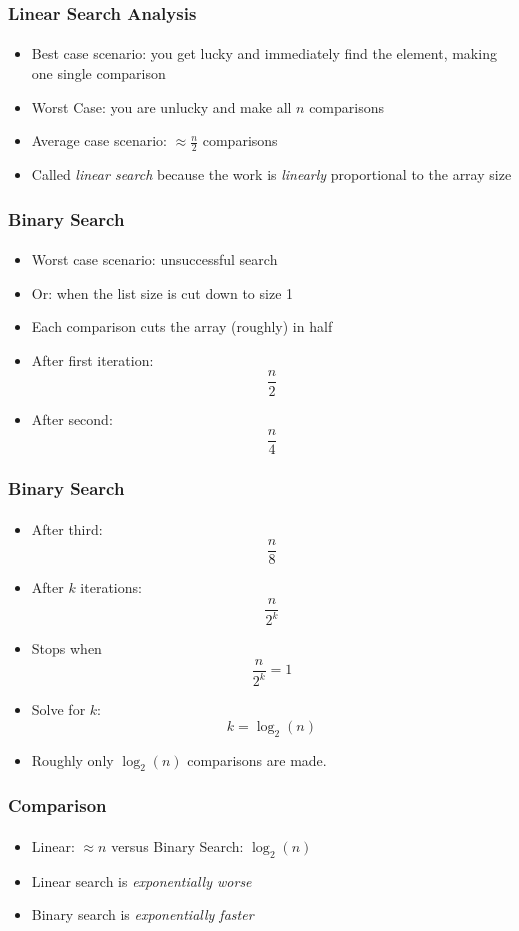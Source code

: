 \documentclass[]{beamer}
\begin{document}
\begin{frame}[fragile]
  \frametitle{Linear Search Analysis}
  \framesubtitle{}
  
\begin{itemize}[<+->]
  \item Best case scenario: you get lucky and immediately find the element, making one single comparison
  \item Worst Case: you are unlucky and make all $n$ comparisons
  \item Average case scenario: $\approx \frac{n}{2}$ comparisons
  \item Called \emph{linear search} because the work is \emph{linearly} proportional to the array size
\end{itemize}

\end{frame}

\begin{frame}[fragile]
  \frametitle{Binary Search}
  \framesubtitle{}
  
\begin{itemize}[<+->]
  \item Worst case scenario: unsuccessful search
  \item Or: when the list size is cut down to size 1
  \item Each comparison cuts the array (roughly) in half
  \item After first iteration:
  	$$\frac{n}{2}$$
  \item After second:	
  	$$\frac{n}{4}$$
\end{itemize}
\end{frame}

\begin{frame}[fragile]
  \frametitle{Binary Search}
  \framesubtitle{}
  
\begin{itemize}[<+->]
    \item After third:	
  	$$\frac{n}{8}$$
  \item After $k$ iterations:	
  	$$\frac{n}{2^k}$$
  \item Stops when 
  	$$\frac{n}{2^k} = 1$$
  \item Solve for $k$: 
    $$k = \log_2{(n)}$$    
  \item Roughly only $\log_2{(n)}$ comparisons are made.
\end{itemize}

\end{frame}

\begin{frame}[fragile]
  \frametitle{Comparison}
  \framesubtitle{}

\begin{itemize}[<+->]
  \item Linear: $\approx n$ versus Binary Search: $\log_2{(n)}$
  \item Linear search is \emph{exponentially worse}
  \item Binary search is \emph{exponentially faster}
\end{itemize}

\end{frame}
\end{document}
